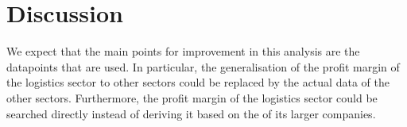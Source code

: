 \section{Discussion}\label{sec:discussion}
We expect that the main points for improvement in this analysis are the datapoints that are used. In particular, the generalisation of the profit margin of the logistics sector to other sectors could be replaced by the actual data of the other sectors. Furthermore, the profit margin of the logistics sector could be searched directly instead of deriving it based on the of its larger companies.

